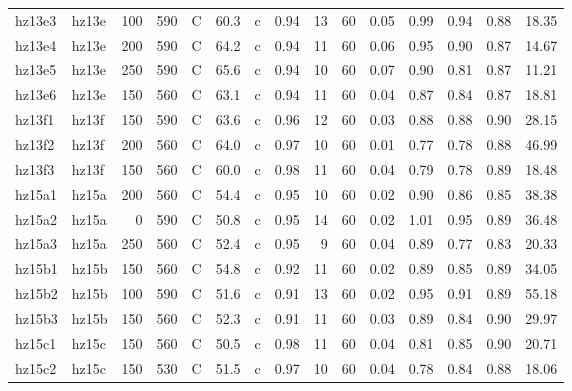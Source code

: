 \documentclass{article}
\begin{document}
\begin{landscape}
\begin{longtable}{llrrlrlrrrrrrrr}
      hz13e3 &      hz13e &  100 &  590 &     C &    60.3 &   c &  0.94 &  13 &         60 &  0.05 &  0.99 &  0.94 &  0.88 &   18.35 \\
      hz13e4 &      hz13e &  200 &  590 &     C &    64.2 &   c &  0.94 &  11 &         60 &  0.06 &  0.95 &  0.90 &  0.87 &   14.67 \\
      hz13e5 &      hz13e &  250 &  590 &     C &    65.6 &   c &  0.94 &  10 &         60 &  0.07 &  0.90 &  0.81 &  0.87 &   11.21 \\
      hz13e6 &      hz13e &  150 &  560 &     C &    63.1 &   c &  0.94 &  11 &         60 &  0.04 &  0.87 &  0.84 &  0.87 &   18.81 \\
      hz13f1 &      hz13f &  150 &  590 &     C &    63.6 &   c &  0.96 &  12 &         60 &  0.03 &  0.88 &  0.88 &  0.90 &   28.15 \\
      hz13f2 &      hz13f &  200 &  560 &     C &    64.0 &   c &  0.97 &  10 &         60 &  0.01 &  0.77 &  0.78 &  0.88 &   46.99 \\
      hz13f3 &      hz13f &  150 &  560 &     C &    60.0 &   c &  0.98 &  11 &         60 &  0.04 &  0.79 &  0.78 &  0.89 &   18.48 \\
      hz15a1 &      hz15a &  200 &  560 &     C &    54.4 &   c &  0.95 &  10 &         60 &  0.02 &  0.90 &  0.86 &  0.85 &   38.38 \\
      hz15a2 &      hz15a &    0 &  590 &     C &    50.8 &   c &  0.95 &  14 &         60 &  0.02 &  1.01 &  0.95 &  0.89 &   36.48 \\
      hz15a3 &      hz15a &  250 &  560 &     C &    52.4 &   c &  0.95 &   9 &         60 &  0.04 &  0.89 &  0.77 &  0.83 &   20.33 \\
      hz15b1 &      hz15b &  150 &  560 &     C &    54.8 &   c &  0.92 &  11 &         60 &  0.02 &  0.89 &  0.85 &  0.89 &   34.05 \\
      hz15b2 &      hz15b &  100 &  590 &     C &    51.6 &   c &  0.91 &  13 &         60 &  0.02 &  0.95 &  0.91 &  0.89 &   55.18 \\
      hz15b3 &      hz15b &  150 &  560 &     C &    52.3 &   c &  0.91 &  11 &         60 &  0.03 &  0.89 &  0.84 &  0.90 &   29.97 \\
      hz15c1 &      hz15c &  150 &  560 &     C &    50.5 &   c &  0.98 &  11 &         60 &  0.04 &  0.81 &  0.85 &  0.90 &   20.71 \\
      hz15c2 &      hz15c &  150 &  530 &     C &    51.5 &   c &  0.97 &  10 &         60 &  0.04 &  0.78 &  0.84 &  0.88 &   18.06 \\

\end{longtable}
\end{landscape}
\end{document}
